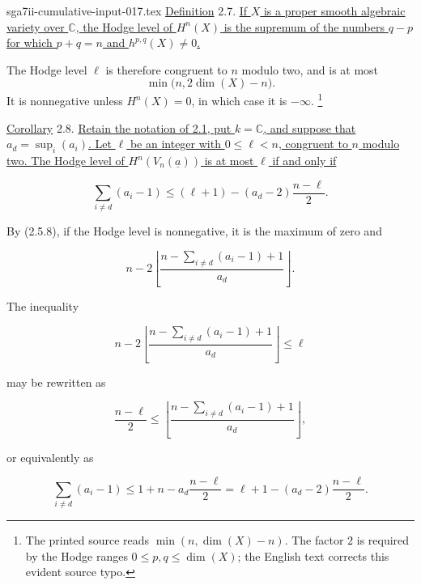 \begin{filecontents*}{sga7ii-cumulative-input-017.tex}
\underline{Definition} 2.7. \underline{If $X$ is a proper smooth algebraic
variety over $\mathbb C$, the Hodge level of $H^n(X)$ is the supremum of
the numbers $q-p$ for which $p+q=n$ and $h^{p,q}(X)\ne0$.}

The Hodge level $\ell$ is therefore congruent to $n$ modulo two, and is at
most
\[
\min\bigl(n,2\dim(X)-n\bigr).
\]
It is nonnegative unless $H^n(X)=0$, in which case it is $-\infty$.
\footnote{The printed source reads
$\min(n,\dim(X)-n)$.  The factor $2$ is required by the Hodge ranges
$0\leq p,q\leq\dim(X)$; the English text corrects this evident source
typo.}

\underline{Corollary} 2.8. \underline{Retain the notation of 2.1, put
$k=\mathbb C$, and suppose that $a_d=\sup_i(a_i)$.  Let $\ell$ be an
integer with $0\leq\ell<n$, congruent to $n$ modulo two.  The Hodge level
of $H^n(V_n(\underline a))$ is at most $\ell$ if and only if}


\begin{equation*}
\sum_{i\ne d}(a_i-1)
\leq (\ell+1)-(a_d-2)\frac{n-\ell}{2}.
\end{equation*}

By (2.5.8), if the Hodge level is nonnegative, it is the maximum of zero
and

\begin{equation*}
n-2\left\lfloor
\frac{n-\sum_{i\ne d}(a_i-1)+1}{a_d}
\right\rfloor.
\end{equation*}

The inequality

\begin{equation*}
n-2\left\lfloor
\frac{n-\sum_{i\ne d}(a_i-1)+1}{a_d}
\right\rfloor\leq\ell
\end{equation*}

may be rewritten as

\begin{equation*}
\frac{n-\ell}{2}
\leq
\left\lfloor
\frac{n-\sum_{i\ne d}(a_i-1)+1}{a_d}
\right\rfloor,
\end{equation*}

or equivalently as

\begin{equation*}
\sum_{i\ne d}(a_i-1)
\leq 1+n-a_d\frac{n-\ell}{2}
=\ell+1-(a_d-2)\frac{n-\ell}{2}.
\end{equation*}


\end{filecontents*}
